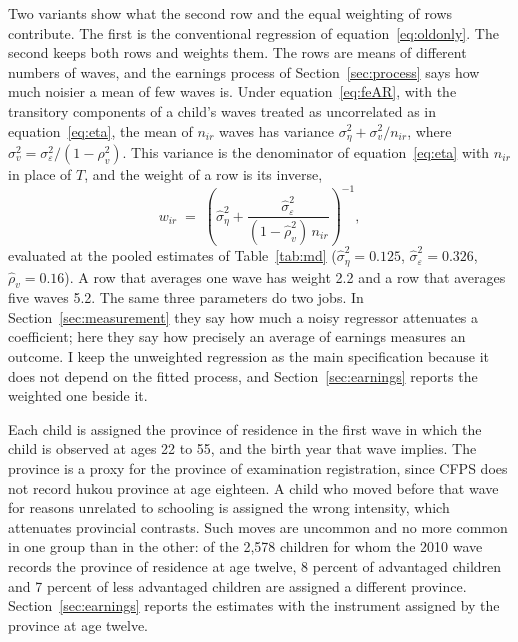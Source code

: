 \documentclass[11pt]{article}
\begin{document}
Two variants show what the second row and the equal weighting of rows
contribute. The first is the conventional regression of equation~\eqref{eq:oldonly}.
The second keeps both rows and weights them. The rows are means of
different numbers of waves, and the earnings process of
Section~\ref{sec:process} says how much noisier a mean of few waves is.
Under equation~\eqref{eq:feAR}, with the transitory components of a
child's waves treated as uncorrelated as in equation~\eqref{eq:eta},
the mean of $n_{ir}$ waves has variance
$\sigma^2_\eta + \sigma^2_v / n_{ir}$, where
$\sigma^2_v = \sigma^2_\varepsilon / (1 - \rho_v^2)$. This variance is the denominator of equation~\eqref{eq:eta} with $n_{ir}$ in place of $T$, and the weight of
a row is its inverse,
\begin{equation}
w_{ir} \;=\; \left( \hat\sigma^2_\eta +
\frac{\hat\sigma^2_\varepsilon}{(1 - \hat\rho_v^2)\, n_{ir}}
\right)^{-1},
\label{eq:weights}
\end{equation}
evaluated at the pooled estimates of Table~\ref{tab:md} ($\hat\sigma^2_\eta = 0.125$, $\hat\sigma^2_\varepsilon = 0.326$, $\hat\rho_v = 0.16$). A row that averages one wave has weight 2.2 and a row that averages five waves 5.2. The same three parameters do two jobs. In Section~\ref{sec:measurement} they say how much a noisy regressor attenuates a coefficient; here they say how precisely an average of earnings measures an outcome. I keep the unweighted regression as the main specification because it does not depend on the fitted process, and Section~\ref{sec:earnings} reports the
weighted one beside it.

Each child is assigned the province of residence in the first
wave in which the child is observed at ages 22 to 55, and the birth year that wave implies. The province is a
proxy for the province of examination registration, since CFPS does not
record hukou province at age eighteen. A child who moved before that wave for reasons
unrelated to schooling is assigned the wrong intensity, which attenuates
provincial contrasts. Such moves are uncommon and no more common in one group than in the other: of the 2,578 children for whom the 2010 wave records the province of residence at age twelve, 8 percent of advantaged children and 7 percent of less advantaged children are assigned a different province. Section~\ref{sec:earnings} reports the estimates with the instrument
assigned by the province at age twelve.
\end{document}
